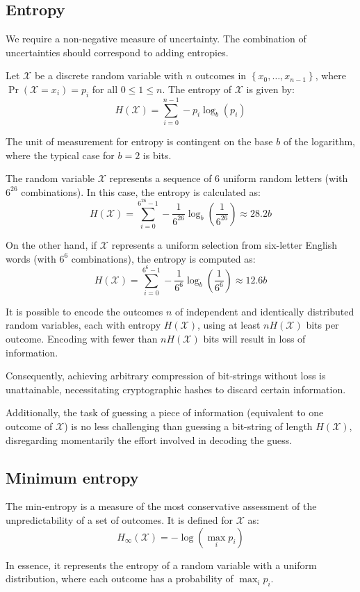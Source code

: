 \subsection{Entropy}
We require a non-negative measure of uncertainty. 
The combination of uncertainties should correspond to adding entropies.
\begin{definition}
    Let $\mathcal{X}$ be a discrete random variable with $n$ outcomes in $\left\{ x_0,\dots,x_{n-1} \right\}$, where $\Pr(\mathcal{X}=x_i)=p_i$ for all $0 \leq 1 \leq n$. 
    The entropy of $\mathcal{X}$ is given by:
    \[H(\mathcal{X})=\sum_{i=0}^{n-1}-p_i\log_b\left(p_i\right)\]
\end{definition}
The unit of measurement for entropy is contingent on the base $b$ of the logarithm, where the typical case for $b = 2$ is bits.
\begin{example}
    The random variable $\mathcal{X}$ represents a sequence of 6 uniform random letters (with $6^{26}$ combinations). 
    In this case, the entropy is calculated as:
    \[H(\mathcal{X})=\sum_{i=0}^{6^{26}-1}-\dfrac{1}{6^{26}}\log_b\left(\dfrac{1}{6^{26}}\right)\approx 28.2b\]

    On the other hand, if $\mathcal{X}$ represents a uniform selection from six-letter English words (with $6^{6}$ combinations), the entropy is computed as:
    \[H(\mathcal{X})=\sum_{i=0}^{6^{6}-1}-\dfrac{1}{6^{6}}\log_b\left(\dfrac{1}{6^{6}}\right)\approx 12.6b\]
\end{example}

\begin{theorem}
    It is possible to encode the outcomes $n$ of independent and identically distributed random variables, each with entropy $H(\mathcal{X})$, using at least $nH(\mathcal{X})$ bits per outcome. 
    Encoding with fewer than $nH(\mathcal{X})$ bits will result in loss of information.
\end{theorem}
Consequently, achieving arbitrary compression of bit-strings without loss is unattainable, necessitating cryptographic hashes to discard certain information.

Additionally, the task of guessing a piece of information (equivalent to one outcome of $\mathcal{X}$) is no less challenging than guessing a bit-string of length $H(\mathcal{X})$, disregarding momentarily the effort involved in decoding the guess.

\subsection{Minimum entropy}
\begin{definition}
    The min-entropy is a measure of the most conservative assessment of the unpredictability of a set of outcomes.
    It is defined for $\mathcal{X}$ as:
    \[H_\infty(\mathcal{X})=-\log(\max_ip_i)\]
\end{definition}
In essence, it represents the entropy of a random variable with a uniform distribution, where each outcome has a probability of $\max_ip_i$.

